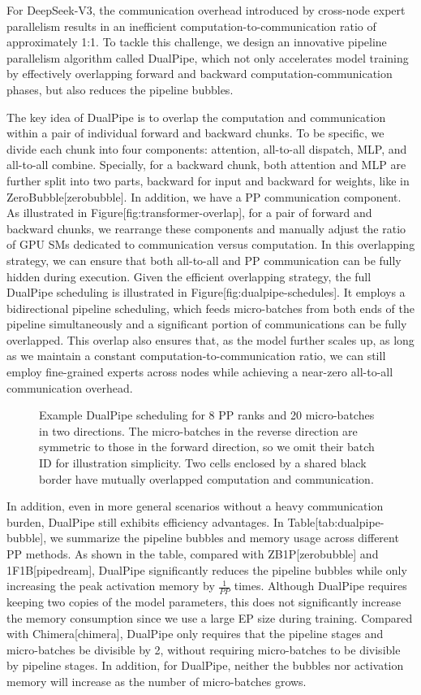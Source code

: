 \documentclass[11pt,a4paper]{article}
\begin{document}
For DeepSeek-V3, the communication overhead introduced by cross-node expert parallelism results in an inefficient computation-to-communication ratio of approximately 1:1. To tackle this challenge, we design an innovative pipeline parallelism algorithm called DualPipe, which not only accelerates model training by effectively overlapping forward and backward computation-communication phases, but also reduces the pipeline bubbles.

The key idea of DualPipe is to overlap the computation and communication within a pair of individual forward and backward chunks. To be specific, we divide each chunk into four components: attention, all-to-all dispatch, MLP, and all-to-all combine. Specially, for a backward chunk, both attention and MLP are further split into two parts, backward for input and backward for weights, like in ZeroBubble[zerobubble]. In addition, we have a PP communication component. As illustrated in Figure[fig:transformer-overlap], for a pair of forward and backward chunks, we rearrange these components and manually adjust the ratio of GPU SMs dedicated to communication versus computation. In this overlapping strategy, we can ensure that both all-to-all and PP communication can be fully hidden during execution. Given the efficient overlapping strategy, the full DualPipe scheduling is illustrated in Figure[fig:dualpipe-schedules]. It employs a bidirectional pipeline scheduling, which feeds micro-batches from both ends of the pipeline simultaneously and a significant portion of communications can be fully overlapped. This overlap also ensures that, as the model further scales up, as long as we maintain a constant computation-to-communication ratio, we can still employ fine-grained experts across nodes while achieving a near-zero all-to-all communication overhead.

\begin{figure}[h]
\caption{Example DualPipe scheduling for 8 PP ranks and 20 micro-batches in two directions. The micro-batches in the reverse direction are symmetric to those in the forward direction, so we omit their batch ID for illustration simplicity. Two cells enclosed by a shared black border have mutually overlapped computation and communication.}
\end{figure}

In addition, even in more general scenarios without a heavy communication burden, DualPipe still exhibits efficiency advantages. In Table[tab:dualpipe-bubble], we summarize the pipeline bubbles and memory usage across different PP methods. As shown in the table, compared with ZB1P[zerobubble] and 1F1B[pipedream], DualPipe significantly reduces the pipeline bubbles while only increasing the peak activation memory by  $\frac{1}{PP}$  times. Although DualPipe requires keeping two copies of the model parameters, this does not significantly increase the memory consumption since we use a large EP size during training. Compared with Chimera[chimera], DualPipe only requires that the pipeline stages and micro-batches be divisible by 2, without requiring micro-batches to be divisible by pipeline stages. In addition, for DualPipe, neither the bubbles nor activation memory will increase as the number of micro-batches grows.
\end{document}

